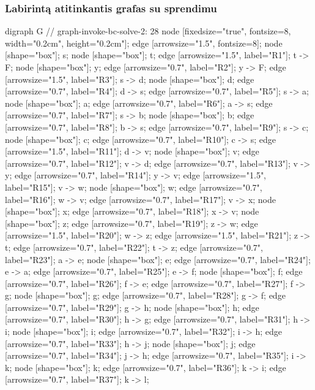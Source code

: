 \subsubsection{Labirintą atitinkantis grafas su sprendimu}

\begin{pythonaienv}
digraph G { // graph-invoke-bc-solve-2: 28 
node [fixedsize="true", fontsize=8, width="0.2cm", height="0.2cm"];
edge [arrowsize="1.5", fontsize=8];
node [shape="box"]; s; 
node [shape="box"]; t; 
edge [arrowsize="1.5", label="R1"]; t -> F; 
node [shape="box"]; y; 
edge [arrowsize="0.7", label="R2"]; y -> F; 
edge [arrowsize="1.5", label="R3"]; s -> d; 
node [shape="box"]; d; 
edge [arrowsize="0.7", label="R4"]; d -> s; 
edge [arrowsize="0.7", label="R5"]; s -> a; 
node [shape="box"]; a; 
edge [arrowsize="0.7", label="R6"]; a -> s; 
edge [arrowsize="0.7", label="R7"]; s -> b; 
node [shape="box"]; b; 
edge [arrowsize="0.7", label="R8"]; b -> s; 
edge [arrowsize="0.7", label="R9"]; s -> c; 
node [shape="box"]; c; 
edge [arrowsize="0.7", label="R10"]; c -> s; 
edge [arrowsize="1.5", label="R11"]; d -> v; 
node [shape="box"]; v; 
edge [arrowsize="0.7", label="R12"]; v -> d; 
edge [arrowsize="0.7", label="R13"]; v -> y; 
edge [arrowsize="0.7", label="R14"]; y -> v; 
edge [arrowsize="1.5", label="R15"]; v -> w; 
node [shape="box"]; w; 
edge [arrowsize="0.7", label="R16"]; w -> v; 
edge [arrowsize="0.7", label="R17"]; v -> x; 
node [shape="box"]; x; 
edge [arrowsize="0.7", label="R18"]; x -> v; 
node [shape="box"]; z; 
edge [arrowsize="0.7", label="R19"]; z -> w; 
edge [arrowsize="1.5", label="R20"]; w -> z; 
edge [arrowsize="1.5", label="R21"]; z -> t; 
edge [arrowsize="0.7", label="R22"]; t -> z; 
edge [arrowsize="0.7", label="R23"]; a -> e; 
node [shape="box"]; e; 
edge [arrowsize="0.7", label="R24"]; e -> a; 
edge [arrowsize="0.7", label="R25"]; e -> f; 
node [shape="box"]; f; 
edge [arrowsize="0.7", label="R26"]; f -> e; 
edge [arrowsize="0.7", label="R27"]; f -> g; 
node [shape="box"]; g; 
edge [arrowsize="0.7", label="R28"]; g -> f; 
edge [arrowsize="0.7", label="R29"]; g -> h; 
node [shape="box"]; h; 
edge [arrowsize="0.7", label="R30"]; h -> g; 
edge [arrowsize="0.7", label="R31"]; h -> i; 
node [shape="box"]; i; 
edge [arrowsize="0.7", label="R32"]; i -> h; 
edge [arrowsize="0.7", label="R33"]; h -> j; 
node [shape="box"]; j; 
edge [arrowsize="0.7", label="R34"]; j -> h; 
edge [arrowsize="0.7", label="R35"]; i -> k; 
node [shape="box"]; k; 
edge [arrowsize="0.7", label="R36"]; k -> i; 
edge [arrowsize="0.7", label="R37"]; k -> l; 
}
\end{pythonaienv}
